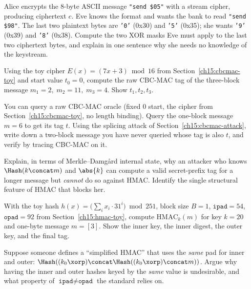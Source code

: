 \begin{exercise}
Alice encrypts the 8-byte ASCII message \texttt{"send \$05"} with a stream cipher, producing ciphertext $c$. Eve knows the format and wants the bank to read \texttt{"send \$98"}. The last two plaintext bytes are \texttt{'0'} (0x30) and \texttt{'5'} (0x35); she wants \texttt{'9'} (0x39) and \texttt{'8'} (0x38). Compute the two XOR masks Eve must apply to the last two ciphertext bytes, and explain in one sentence why she needs no knowledge of the keystream.
\end{exercise}

\begin{exercise}
Using the toy cipher $E(x)=(7x+3)\bmod 16$ from Section~\ref{ch15:cbcmac-toy} and start value $t_0=0$, compute the raw CBC-MAC tag of the three-block message $m_1=2,\;m_2=11,\;m_3=4$. Show $t_1,t_2,t_3$.
\end{exercise}

\begin{exercise}
You can query a raw CBC-MAC oracle (fixed $0$ start, the cipher from Section~\ref{ch15:cbcmac-toy}, no length binding). Query the one-block message $m=6$ to get its tag $t$. Using the splicing attack of Section~\ref{ch15:cbcmac-attack}, write down a two-block message you have never queried whose tag is also $t$, and verify by tracing CBC-MAC on it.
\end{exercise}

\begin{exercise}
Explain, in terms of Merkle--Damg\aa{}rd internal state, why an attacker who knows $\Hash(k\concat m)$ and $\abs{k}$ can compute a valid secret-prefix tag for a longer message but \emph{cannot} do so against HMAC. Identify the single structural feature of HMAC that blocks her.
\end{exercise}

\begin{exercise}
With the toy hash $h(x)=\big(\sum_i x_i\cdot 31^{i}\big)\bmod 251$, block size $B=1$, $\texttt{ipad}=54$, $\texttt{opad}=92$ from Section~\ref{ch15:hmac-toy}, compute $\mathrm{HMAC}_k(m)$ for key $k=20$ and one-byte message $m=[3]$. Show the inner key, the inner digest, the outer key, and the final tag.
\end{exercise}

\begin{exercise}
Suppose someone defines a ``simplified HMAC'' that uses the \emph{same} pad for inner and outer: $\Hash((k_0\xor\texttt{p})\concat\Hash((k_0\xor\texttt{p})\concat m))$. Argue why having the inner and outer hashes keyed by the \emph{same} value is undesirable, and what property of $\texttt{ipad}\ne\texttt{opad}$ the standard relies on.
\end{exercise}

